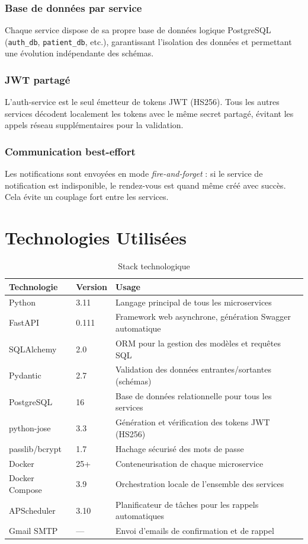 \documentclass[12pt,a4paper]{article}
\begin{document}
\subsubsection{Base de données par service}
Chaque service dispose de sa propre base de données logique PostgreSQL (\texttt{auth\_db}, \texttt{patient\_db}, etc.), garantissant l'isolation des données et permettant une évolution indépendante des schémas.

\subsubsection{JWT partagé}
L'auth-service est le seul émetteur de tokens JWT (HS256). Tous les autres services décodent localement les tokens avec le même secret partagé, évitant les appels réseau supplémentaires pour la validation.

\subsubsection{Communication best-effort}
Les notifications sont envoyées en mode \textit{fire-and-forget} : si le service de notification est indisponible, le rendez-vous est quand même créé avec succès. Cela évite un couplage fort entre les services.

\section{Technologies Utilisées}

\begin{table}[H]
\centering
\caption{Stack technologique}
\begin{tabularx}{\textwidth}{L{4cm} L{3.5cm} X}
\toprule
\textbf{Technologie} & \textbf{Version} & \textbf{Usage} \\
\midrule
Python & 3.11 & Langage principal de tous les microservices \\
FastAPI & 0.111 & Framework web asynchrone, génération Swagger automatique \\
SQLAlchemy & 2.0 & ORM pour la gestion des modèles et requêtes SQL \\
Pydantic & 2.7 & Validation des données entrantes/sortantes (schémas) \\
PostgreSQL & 16 & Base de données relationnelle pour tous les services \\
python-jose & 3.3 & Génération et vérification des tokens JWT (HS256) \\
passlib/bcrypt & 1.7 & Hachage sécurisé des mots de passe \\
Docker & 25+ & Conteneurisation de chaque microservice \\
Docker Compose & 3.9 & Orchestration locale de l'ensemble des services \\
APScheduler & 3.10 & Planificateur de tâches pour les rappels automatiques \\
Gmail SMTP & — & Envoi d'emails de confirmation et de rappel \\
\bottomrule
\end{tabularx}
\end{table}
\end{document}
